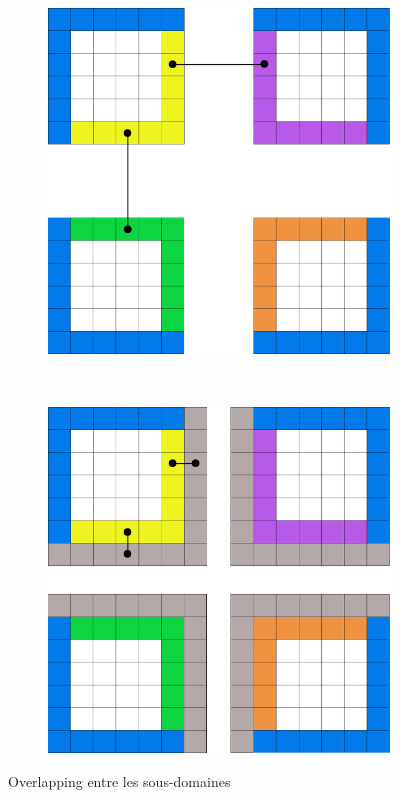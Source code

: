 \begin{figure}[h!]
  \centering
  \begin{subfigure}[b]{0.5\textwidth}
    \centering
    \includegraphics[scale=0.15]{figures/depdomain.png}
  \caption{\label{fig:depdom} }
  \end{subfigure}%
  ~
  \begin{subfigure}[b]{0.5\textwidth}
    \centering
    \includegraphics[scale=0.15]{figures/depdomain-overlap.png}
  \caption{\label{fig:depdomover} }
  \end{subfigure}
  \caption{\label{fig:domdep}Overlapping entre les sous-domaines}
\end{figure}


